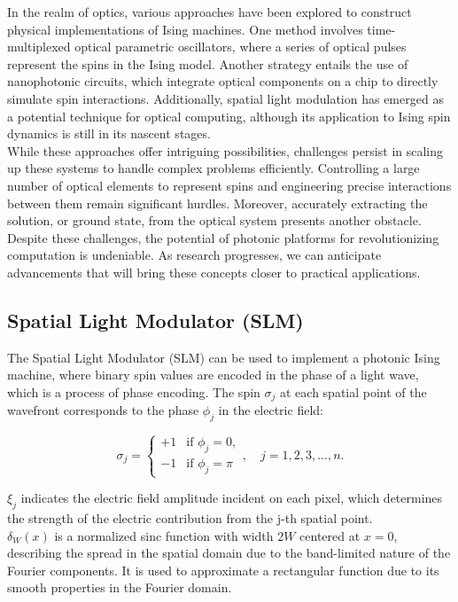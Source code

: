 In the realm of optics, various approaches have been explored to construct physical implementations of Ising machines. One method involves time-multiplexed optical parametric oscillators, where a series of optical pulses represent the spins in the Ising model. Another strategy entails the use of nanophotonic circuits, which integrate optical components on a chip to directly simulate spin interactions. Additionally, spatial light modulation has emerged as a potential technique for optical computing, although its application to Ising spin dynamics is still in its nascent stages.\\

While these approaches offer intriguing possibilities, challenges persist in scaling up these systems to handle complex problems efficiently. Controlling a large number of optical elements to represent spins and engineering precise interactions between them remain significant hurdles. Moreover, accurately extracting the solution, or ground state, from the optical system presents another obstacle.\\

Despite these challenges, the potential of photonic platforms for revolutionizing computation is undeniable. As research progresses, we can anticipate advancements that will bring these concepts closer to practical applications.\\

\subsection{Spatial Light Modulator (SLM)}
The Spatial Light Modulator (SLM) can be used to implement a photonic Ising machine, where binary spin values are encoded in the phase of a light wave, which is a process of phase encoding. The spin $\sigma_j$ at each spatial point of the wavefront corresponds to the phase $\phi_j$ in the electric field:

\[
\sigma_j = \begin{cases} 
+1 & \text{if } \phi_j = 0, \\
-1 & \text{if } \phi_j = \pi
\end{cases}
, \quad j = 1,2,3,..., n.
\]

$\xi_j$ indicates the electric field amplitude incident on each pixel, which determines the strength of the electric contribution from the j-th spatial point. \\

$\delta_W(x)$ is a normalized sinc function with width $2W$ centered at $x = 0$, describing the spread in the spatial domain due to the band-limited nature of the Fourier components. It is used to approximate a rectangular function due to its smooth properties in the Fourier domain. \\

